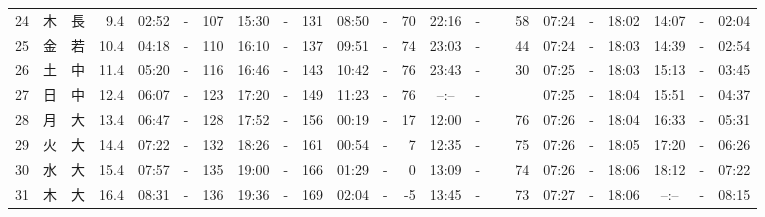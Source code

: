 \documentclass[12pt,a4j]{jsarticle}
\begin{document}
\begin{table}[htbp]
\begin{center}
{\begin{tabular}{|rc|cr|ccrccr|ccrccr|ccc|ccc|}
24 & 木 & 長 &  9.4 &  02:52 &-& 107 &  15:30 &-& 131 &  08:50 &-&  70 &  22:16 &-&  58 & 07:24 & -& 18:02 & 14:07 & -& 02:04 \\
25 & 金 & 若 & 10.4 &  04:18 &-& 110 &  16:10 &-& 137 &  09:51 &-&  74 &  23:03 &-&  44 & 07:24 & -& 18:03 & 14:39 & -& 02:54 \\
26 & 土 & 中 & 11.4 &  05:20 &-& 116 &  16:46 &-& 143 &  10:42 &-&  76 &  23:43 &-&  30 & 07:25 & -& 18:03 & 15:13 & -& 03:45 \\
27 & 日 & 中 & 12.4 &  06:07 &-& 123 &  17:20 &-& 149 &  11:23 &-&  76 &  --:-- &-&~~~~~ & 07:25 & -& 18:04 & 15:51 & -& 04:37 \\
28 & 月 & 大 & 13.4 &  06:47 &-& 128 &  17:52 &-& 156 &  00:19 &-&  17 &  12:00 &-&  76 & 07:26 & -& 18:04 & 16:33 & -& 05:31 \\
29 & 火 & 大 & 14.4 &  07:22 &-& 132 &  18:26 &-& 161 &  00:54 &-&   7 &  12:35 &-&  75 & 07:26 & -& 18:05 & 17:20 & -& 06:26 \\
30 & 水 & 大 & 15.4 &  07:57 &-& 135 &  19:00 &-& 166 &  01:29 &-&   0 &  13:09 &-&  74 & 07:26 & -& 18:06 & 18:12 & -& 07:22 \\
31 & 木 & 大 & 16.4 &  08:31 &-& 136 &  19:36 &-& 169 &  02:04 &-&  -5 &  13:45 &-&  73 & 07:27 & -& 18:06 & --:-- & -& 08:15 \\
   \hline
   \end{tabular}}
   \end{center}
\end{table}
\newpage
\end{document}
